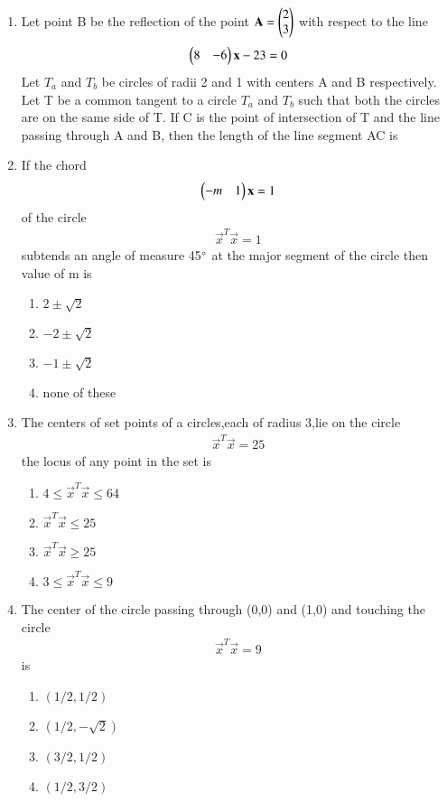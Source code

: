 \begin{enumerate}[label=\arabic*.,ref=\thesubsection.\theenumi]
\item Let point B be the reflection of the point $\mathbf{A}=\begin{pmatrix}2\\3\end{pmatrix}$ with respect to the line 
\begin{align}
\begin{pmatrix}8&-6\end{pmatrix}\mathbf x-23=0
\end{align}
Let $T_a$ and $T_b$ be circles of radii 2 and 1 with centers A and B respectively. Let T be a common tangent to a circle $T_a$ and $T_b$ such that both the circles are on the same side of T. If C is the point of intersection of T and the line passing through A and B, then the length of the line segment AC is

\item  If the chord 
\begin{align}
\begin{pmatrix}-m&1\end{pmatrix}\mathbf x=1
\end{align} 
of the circle 
\begin{align}
\vec x^T\vec x=1
\end{align} 
subtends an angle of measure 45$\degree$ at the major segment of the circle then value of m is
\begin{enumerate}
\item $2\pm\sqrt{2}$
\item $-2\pm\sqrt{2}$
\item $-1\pm\sqrt{2}$
\item none of these
\end{enumerate}
     
\item The centers of set points of a circles,each of radius 3,lie on the circle 
\begin{align}
\vec x^T\vec x=25
\end{align} 
the locus of any point in the set is
\begin{enumerate}
\item $4\leq \vec x^T\vec x \leq 64$
\item $\vec x^T\vec x \leq 25$
\item $\vec x^T\vec x \geq 25$
\item $3\leq \vec x^T \vec x \leq 9$
\end{enumerate}
   
\item The center of the circle passing through (0,0) and (1,0) and touching the circle 
\begin{align}
\vec x^T\vec x=9
\end{align}
is
\begin{enumerate}
\item $(1/2,1/2)$
\item $(1/2,-\sqrt{2})$
\item $(3/2,1/2)$
\item $(1/2,3/2)$
\end{enumerate}   
 

\end{enumerate}
